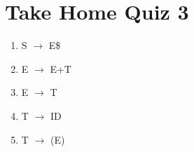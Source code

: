 \documentclass{report}
\begin{document}
\newpage
\renewcommand\thechapter{Q3}
\chapter{Take Home Quiz 3}
\begin{multicols}{2}
  \begin{enumerate}
    \setlength\itemsep{-.25em}
    \item S $\rightarrow$ E\$
    \item E $\rightarrow$ E+T
    \item E $\rightarrow$ T
    \item T $\rightarrow$ ID
    \item T $\rightarrow$ (E)
     \newline\newline\newline\newline\newline\newline\newline\newline\newline\newline\newline\newline\newline\newline\newline\newline\newline\newline\newline\newline\newline\newline
  \end{enumerate}
  \vspace{-50pt}
  \setlength{\leftskip}{-15em}

\end{multicols}
\end{document}
